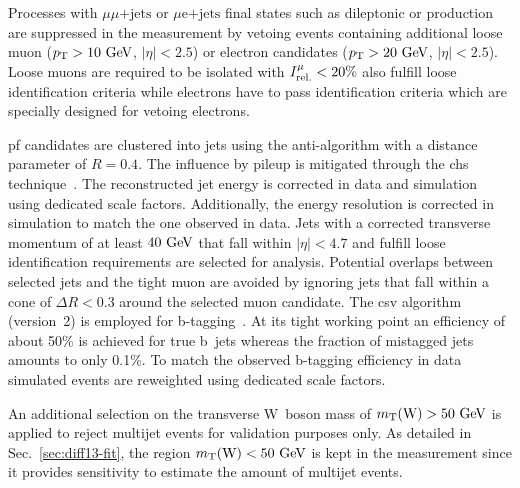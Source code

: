 Processes with $\mu\mu\mathrm{\mbox{+}jets}$ or $\mu\mathrm{e}\mathrm{\mbox{+}jets}$ final states such as dileptonic \ttbar or \zjets production are suppressed in the measurement by vetoing events containing additional loose muon ($p_\textrm{T}>10~\textrm{GeV}$, $|\eta|<2.5$) or electron candidates ($p_\textrm{T}>20~\textrm{GeV}$, $|\eta|<2.5$). Loose muons are required to be isolated with $I_\textrm{rel.}^{\mu}<20\%$ also fulfill loose identification criteria while electrons have to pass identification criteria which are specially designed for vetoing electrons.

\Gls{pf} candidates are clustered into jets using the anti-\kt algorithm with a distance parameter of $R=0.4$. The influence by pileup is mitigated through the \gls{chs} technique~\cite{CMS-PAS-JME-14-001}. The reconstructed jet energy is corrected in data and simulation using dedicated scale factors. Additionally, the energy resolution is corrected in simulation to match the one observed in data. Jets with a corrected transverse momentum of at least $40~\textrm{GeV}$ that fall within $|\eta|<4.7$ and fulfill loose identification requirements are selected for analysis. Potential overlaps between selected jets and the tight muon are avoided by ignoring jets that fall within a cone of $\Delta R<0.3$ around the selected muon candidate. The \acrfull{csv} algorithm (version~2) is employed for b-tagging~\cite{CMS-PAS-BTV-15-001}. At its tight working point an efficiency of about 50\% is achieved for true b~jets whereas the fraction of mistagged jets amounts to only 0.1\%. To match the observed b-tagging efficiency in data simulated events are reweighted using dedicated scale factors.

An additional selection on the transverse W~boson mass of $m_{\textrm{T}}(\textrm{W})>50~\textrm{GeV}$ is applied to reject multijet events for validation purposes only. As detailed in Sec.~\ref{sec:diff13-fit}, the region $m_{\textrm{T}}(\textrm{W})<50~\textrm{GeV}$ is kept in the measurement since it provides sensitivity to estimate the amount of multijet events.


